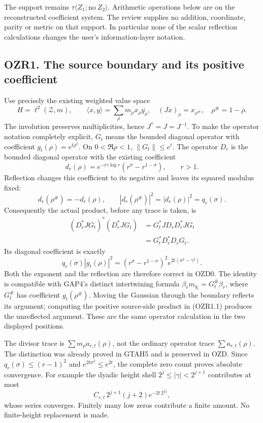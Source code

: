 The support remains \(\tau\langle Z_1;\mathrm{no}\ Z_2\rangle\).
Arithmetic operations below are on the reconstructed coefficient system.
The review supplies no addition, coordinate, parity or metric on that
support. In particular none of the scalar reflection calculations
changes the user's information-layer notation.

\subsection{OZR1. The source boundary and its positive
coefficient}\label{ozr1.-the-source-boundary-and-its-positive-coefficient}

Use precisely the existing weighted value space \[
H=\ell^2(\mathscr Z,m),\qquad
\langle x,y\rangle=\sum_\rho m_\rho x_\rho\overline{y_\rho},
\quad (Jx)_\rho=x_{\rho^\#},\quad \rho^\#=1-\overline\rho.
\] The involution preserves multiplicities, hence \(J^*=J=J^{-1}\). To
make the operator notation completely explicit, \(G_t\) means the
bounded diagonal operator with coefficient \(g_t(\rho)=e^{t\rho^2}\). On
\(0<\Re\rho<1\), \(\|G_t\|\le e^t\). The operator \(D_r\) is the bounded
diagonal operator with the existing coefficient \[
d_r(\rho)=e^{-i\gamma\log r}(r^\sigma-r^{1-\sigma}),\qquad r>1.
\] Reflection changes this coefficient to its negative and leaves its
squared modulus fixed: \[
d_r(\rho^\#)=-d_r(\rho),\qquad
|d_r(\rho^\#)|^2=|d_r(\rho)|^2=q_r(\sigma).
\] Consequently the actual product, before any trace is taken, is \[
\begin{aligned}
(D_r^*JG_t)^*(D_r^*JG_t)
&=G_t^*JD_rD_r^*JG_t\\
&=G_t^*D_r^*D_rG_t.
\end{aligned}
\tag{OZR1.1}
\] Its diagonal coefficient is exactly \[
q_r(\sigma)|g_t(\rho)|^2
=(r^\sigma-r^{1-\sigma})^2e^{2t(\sigma^2-\gamma^2)}.
\tag{OZR1.2}
\] Both the exponent and the reflection are therefore correct in OZD0.
The identity is compatible with GAP4's distinct intertwining formula
\(\beta_rm_{g_t}=G_t^\#\beta_r\), where \(G_t^\#\) has coefficient
\(g_t(\rho^\#)\). Moving the Gaussian through the boundary reflects its
argument; computing the positive source-side product in (OZR1.1)
produces the unreflected argument. These are the same operator
calculation in the two displayed positions.

The divisor trace is \(\sum m_\rho a_{r,t}(\rho)\), not the ordinary
operator trace \(\sum a_{r,t}(\rho)\). The distinction was already
proved in GTAH5 and is preserved in OZD. Since \(q_r(\sigma)\le(r-1)^2\)
and \(e^{2t\sigma^2}\le e^{2t}\), the complete zero count proves
absolute convergence. For example the dyadic height shell
\(2^j\le|\gamma|<2^{j+1}\) contributes at most \[
C_{r,t}\,2^{j+1}(j+2)e^{-2t\,2^{2j}},
\] whose series converges. Finitely many low zeros contribute a finite
amount. No finite-height replacement is made.

